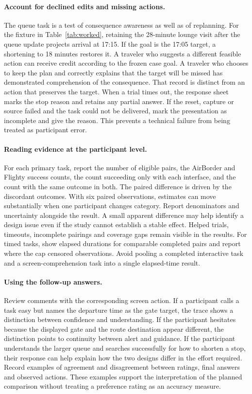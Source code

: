 \documentclass[sigconf,nonacm,balance=false]{acmart}
\begin{document}
\paragraph{Account for declined edits and missing actions.} The queue task is a test of consequence awareness as well as of replanning. For the fixture in Table~\ref{tab:worked}, retaining the 28-minute lounge visit after the queue update projects arrival at 17:15. If the goal is the 17:05 target, a shortening to 18 minutes restores it. A traveler who suggests a different feasible action can receive credit according to the frozen case goal. A traveler who chooses to keep the plan and correctly explains that the target will be missed has demonstrated comprehension of the consequence. That record is distinct from an action that preserves the target. When a trial times out, the response sheet marks the stop reason and retains any partial answer. If the reset, capture or source failed and the task could not be delivered, mark the presentation as incomplete and give the reason. This prevents a technical failure from being treated as participant error.

\paragraph{Reading evidence at the participant level.} For each primary task, report the number of eligible pairs, the AirBorder and Flighty success counts, the count succeeding only with each interface, and the count with the same outcome in both. The paired difference is driven by the discordant outcomes. With six paired observations, estimates can move substantially when one participant changes category. Report denominators and uncertainty alongside the result. A small apparent difference may help identify a design issue even if the study cannot establish a stable effect. Helped trials, timeouts, incomplete pairings and coverage gaps remain visible in the results. For timed tasks, show elapsed durations for comparable completed pairs and report where the cap censored observations. Avoid pooling a completed interactive task and a screen-comprehension task into a single elapsed-time result.

\paragraph{Using the follow-up answers.} Review comments with the corresponding screen action. If a participant calls a task easy but names the departure time as the gate target, the trace shows a distinction between confidence and understanding. If the participant hesitates because the displayed gate and the route destination appear different, the distinction points to continuity between alert and guidance. If the participant understands the larger queue and searches successfully for how to shorten a stop, their response can help explain how the two designs differ in the effort required. Record examples of agreement and disagreement between ratings, final answers and observed actions. These examples support the interpretation of the planned comparison without treating a preference rating as an accuracy measure.
\end{document}
